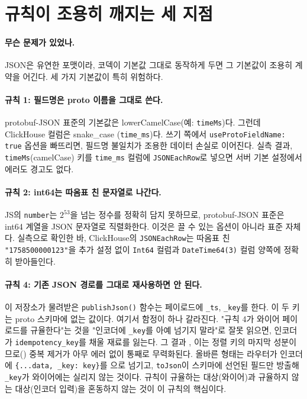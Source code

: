 \section{규칙이 조용히 깨지는 세 지점}
\label{sec:contract-json-rules}

\paragraph{무슨 문제가 있었나.} JSON은 유연한 포맷이라, 코덱이 기본값 그대로 동작하게
두면 그 기본값이 조용히 계약을 어긴다. 세 가지 기본값이 특히 위험하다.

\paragraph{규칙 1: 필드명은 proto 이름을 그대로 쓴다.} protobuf-JSON 표준의 기본값은
lowerCamelCase(예: \texttt{timeMs})다. 그런데 ClickHouse 컬럼은 snake\_case
(\texttt{time\_ms})다. 쓰기 쪽에서 \texttt{useProtoFieldName: true} 옵션을 빠뜨리면,
필드명 불일치가 조용한 데이터 손실로 이어진다. 실측 결과, \texttt{timeMs}(camelCase)
키를 \texttt{time\_ms} 컬럼에 \texttt{JSONEachRow}로 넣으면 서버 기본 설정에서
 에러도 경고도 없다.

\paragraph{규칙 2: int64는 따옴표 친 문자열로 나간다.} JS의 \texttt{number}는
$2^{53}$을 넘는 정수를 정확히 담지 못하므로, protobuf-JSON 표준은 int64 계열을
JSON 문자열로 직렬화한다. 이것은 끌 수 있는 옵션이 아니라 표준 자체다. 실측으로
확인한 바, ClickHouse의 \texttt{JSONEachRow}는 따옴표 친 \texttt{"1758500000123"}을
추가 설정 없이 \texttt{Int64} 컬럼과 \texttt{DateTime64(3)} 컬럼 양쪽에 정확히
받아들인다.

\paragraph{규칙 4: 기존 JSON 경로를 그대로 재사용하면 안 된다.} 이 저장소가
물려받은 \texttt{publishJson()} 함수는 페이로드에 \texttt{\_ts}, \texttt{\_key}를
한다. 이 두 키는 proto 스키마에 없는 값이다. 여기서 함정이 하나 갈라진다. "규칙 4가 와이어 페이로드를 규율한다"는 것을 "인코더에 \texttt{\_key}를 아예
넘기지 말라"로 잘못 읽으면, 인코더가 \texttt{idempotency\_key}를 채울 재료를 잃는다.
그 결과 , 이는 정렬
키의 마지막 성분이므로() 중복 제거가 아무 에러 없이 통째로
무력화된다. 올바른 형태는 라우터가 인코더에 \texttt{\{...data, \_key: key\}}를
으로 넘기고, \texttt{toJson}이 스키마에 선언된 필드만 방출해
\texttt{\_key}가 와이어에는 실리지 않는 것이다. 규칙이 규율하는 대상(와이어)과
규율하지 않는 대상(인코더 입력)을 혼동하지 않는 것이 이 규칙의 핵심이다.

